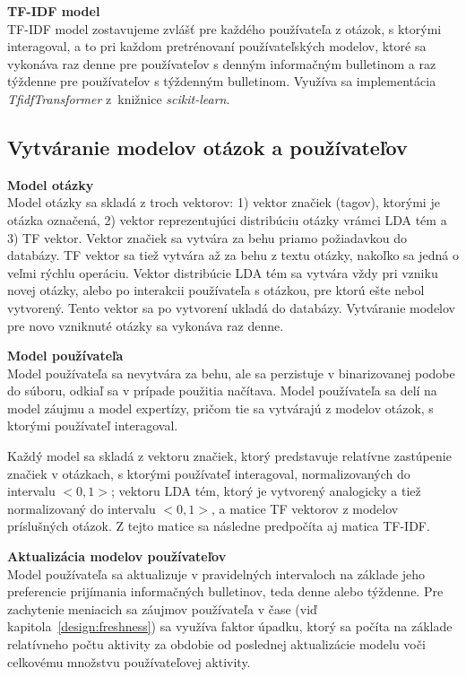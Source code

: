 \textbf{TF-IDF model}\\
TF-IDF model zostavujeme zvlášť pre každého používateľa z otázok, s ktorými interagoval, a to pri každom pretrénovaní používateľských
modelov, ktoré sa vykonáva raz denne pre používateľov s denným informačným bulletinom a raz týždenne pre používateľov s týždenným
bulletinom. Využíva sa implementácia \textit{TfidfTransformer} z~knižnice \textit{scikit-learn}.


\subsection{Vytváranie modelov otázok a používateľov}

\textbf{Model otázky}\\
Model otázky sa skladá z troch vektorov: 1) vektor značiek (tagov), ktorými je otázka označená, 2) vektor reprezentujúci
distribúciu otázky vrámci LDA tém a 3) TF vektor. Vektor značiek sa vytvára za behu priamo požiadavkou do databázy. TF vektor
sa tiež vytvára až za behu z textu otázky, nakoľko sa jedná o veľmi rýchlu operáciu. Vektor distribúcie LDA tém sa vytvára
vždy pri vzniku novej otázky, alebo po interakcii používateľa s otázkou, pre ktorú ešte nebol vytvorený. Tento vektor
sa po vytvorení ukladá do databázy. Vytváranie modelov pre novo vzniknuté otázky sa vykonáva raz denne.

\textbf{Model používateľa}\\
Model používateľa sa nevytvára za behu, ale sa perzistuje v binarizovanej podobe do súboru, odkiaľ sa v prípade použitia
načítava. Model používateľa sa delí na model záujmu a model expertízy, pričom tie sa vytvárajú z modelov otázok, s ktorými
používateľ interagoval.

Každý model sa skladá z vektoru značiek, ktorý predstavuje relatívne zastúpenie značiek v otázkach, s ktorými používateľ interagoval,
normalizovaných do intervalu $<0,1>$; vektoru LDA tém, ktorý je vytvorený analogicky a tiež normalizovaný do intervalu $<0,1>$,
a matice TF vektorov z modelov príslušných otázok. Z tejto matice sa následne predpočíta aj matica TF-IDF.

\textbf{Aktualizácia modelov používateľov}\\
Model používateľa sa aktualizuje v pravidelných intervaloch na základe jeho preferencie prijímania informačných bulletinov, teda
denne alebo týždenne. Pre zachytenie meniacich sa záujmov používateľa v čase (viď kapitola~\ref{design:freshness}) sa využíva
faktor úpadku, ktorý sa počíta na základe relatívneho počtu aktivity za obdobie od poslednej aktualizácie modelu voči
celkovému množstvu používateľovej aktivity.

